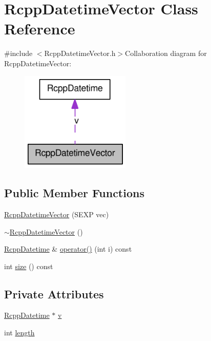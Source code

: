 \hypertarget{classRcppDatetimeVector}{
\section{RcppDatetimeVector Class Reference}
\label{classRcppDatetimeVector}
}


{\ttfamily \#include $<$RcppDatetimeVector.h$>$}Collaboration diagram for RcppDatetimeVector:\nopagebreak
\begin{figure}[H]
\begin{center}
\leavevmode
\includegraphics[width=148pt]{classRcppDatetimeVector__coll__graph}
\end{center}
\end{figure}
\subsection*{Public Member Functions}
\begin{DoxyCompactItemize}
\item 
\hyperlink{classRcppDatetimeVector_a1c1d1e2087fdc8e7601299dc2c4fe24c}{RcppDatetimeVector} (SEXP vec)
\item 
\hyperlink{classRcppDatetimeVector_a81d6c5daba7448058a2f896841ddeb3a}{$\sim$RcppDatetimeVector} ()
\item 
\hyperlink{classRcppDatetime}{RcppDatetime} \& \hyperlink{classRcppDatetimeVector_a5af7ec7f15263cee68ae11ce00770672}{operator()} (int i) const 
\item 
int \hyperlink{classRcppDatetimeVector_ab9c8683a2883c6cc3bb600d0b0682965}{size} () const 
\end{DoxyCompactItemize}
\subsection*{Private Attributes}
\begin{DoxyCompactItemize}
\item 
\hyperlink{classRcppDatetime}{RcppDatetime} $\ast$ \hyperlink{classRcppDatetimeVector_a0138476000351892e9ec591b2c9ec02f}{v}
\item 
int \hyperlink{classRcppDatetimeVector_ae131031fcf2e65b7bfeee3d8e25c4f8c}{length}
\end{DoxyCompactItemize}


